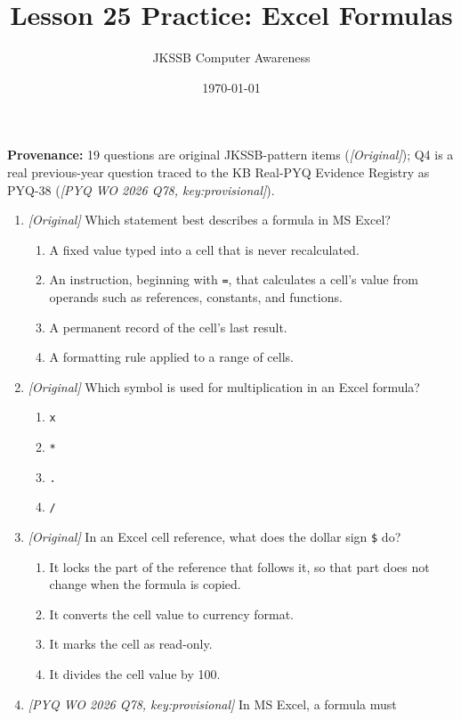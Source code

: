 \documentclass[11pt]{article}
\title{Lesson 25 Practice: Excel Formulas}
\author{JKSSB Computer Awareness}
\date{\today}
\begin{document}
\maketitle
\noindent\textbf{Provenance:} 19 questions are original JKSSB-pattern items
(\textit{[Original]}); Q4 is a real previous-year question traced to the KB
Real-PYQ Evidence Registry as PYQ-38
(\textit{[PYQ WO 2026 Q78, key:provisional]}).

\begin{enumerate}[label=\textbf{Q\arabic*.}, leftmargin=*]
\item \textit{[Original]} Which statement best describes a formula in
  MS Excel?
  \begin{enumerate}[label=\Alph*.]
    \item A fixed value typed into a cell that is never recalculated.
    \item An instruction, beginning with \texttt{=}, that calculates a cell's
      value from operands such as references, constants, and functions.
    \item A permanent record of the cell's last result.
    \item A formatting rule applied to a range of cells.
  \end{enumerate}
\item \textit{[Original]} Which symbol is used for multiplication in an Excel
  formula?
  \begin{enumerate}[label=\Alph*.]
    \item \texttt{x}
    \item \texttt{*}
    \item \texttt{.}
    \item \texttt{/}
  \end{enumerate}
\item \textit{[Original]} In an Excel cell reference, what does the dollar
  sign \texttt{\$} do?
  \begin{enumerate}[label=\Alph*.]
    \item It locks the part of the reference that follows it, so that part
      does not change when the formula is copied.
    \item It converts the cell value to currency format.
    \item It marks the cell as read-only.
    \item It divides the cell value by 100.
  \end{enumerate}
\item \textit{[PYQ WO 2026 Q78, key:provisional]} In MS Excel, a formula must

\end{enumerate}
\end{document}
